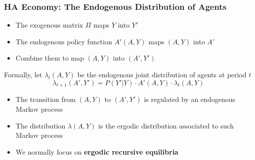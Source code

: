 \documentclass[10pt, aspectratio=1610, natbib, handout]{beamer}
\begin{document}
  \begin{frame}
    \frametitle{HA Economy: The Endogenous Distribution of Agents}

    \begin{itemize}
      \item The exogenous matrix $\Pi$ maps $Y$ into $Y'$
      \item The endogenous policy function $A'(A, Y)$ maps $(A, Y)$ into $A'$
      \item Combine them to map $(A, Y)$ into $(A', Y')$
    \end{itemize}

    \vfill\pause

    Formally, let $\lambda_t(A, Y)$ be the endogenous joint distribution of agents at period $t$
    \begin{equation*}
      \lambda_{t+1}(A', Y') = P(Y' | Y) \cdot A'(A, Y) \cdot \lambda_t(A, Y)
    \end{equation*}

    \vfill\pause

    \begin{itemize}
      \item The transition from $(A, Y)$ to $(A', Y')$ is regulated by an endogenous Markov process
      \item The distribution $\lambda(A, Y)$ is the ergodic distribution associated to such Markov process
      \item We normally focus on \textbf{ergodic recursive equilibria} \hfill{}
    \end{itemize}

  \end{frame}
\end{document}
